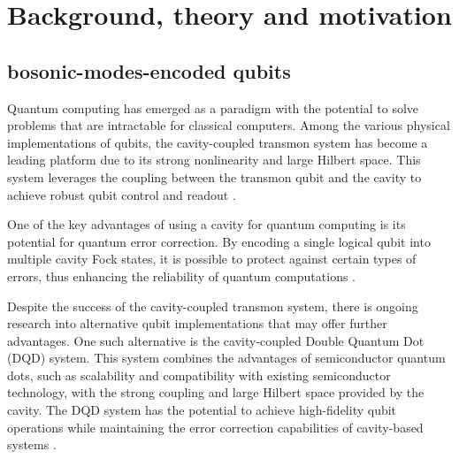 \documentclass[12pt]{article}
\begin{document}
\section{Background, theory and motivation}




\subsection{bosonic-modes-encoded qubits}
Quantum computing has emerged as a paradigm with the potential to solve problems that are intractable for classical computers. Among the various physical implementations of qubits, the cavity-coupled transmon system has become a leading platform due to its strong nonlinearity and large Hilbert space. This system leverages the coupling between the transmon qubit and the cavity to achieve robust qubit control and readout \cite{blais2004, houck2008}.

One of the key advantages of using a cavity for quantum computing is its potential for quantum error correction. By encoding a single logical qubit into multiple cavity Fock states, it is possible to protect against certain types of errors, thus enhancing the reliability of quantum computations \cite{girvin2014, ofek2016}.

Despite the success of the cavity-coupled transmon system, there is ongoing research into alternative qubit implementations that may offer further advantages. One such alternative is the cavity-coupled Double Quantum Dot (DQD) system. This system combines the advantages of semiconductor quantum dots, such as scalability and compatibility with existing semiconductor technology, with the strong coupling and large Hilbert space provided by the cavity. The DQD system has the potential to achieve high-fidelity qubit operations while maintaining the error correction capabilities of cavity-based systems \cite{petersson2012, mi2018}.
\end{document}
